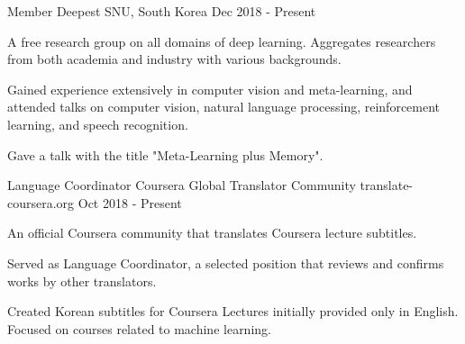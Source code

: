 

\begin{cventries}

  \cventry
    {Member} %
    {Deepest} %
    {SNU, South Korea} %
    {Dec 2018 - Present} %
    {
      \begin{cvitems} %
        \item {A free research group on all domains of deep learning. Aggregates researchers from both academia and industry with various backgrounds.}
        \item {Gained experience extensively in computer vision and meta-learning, and attended talks on computer vision, natural language processing, reinforcement learning, and speech recognition.}
        \item {Gave a talk with the title "Meta-Learning plus Memory".}
      \end{cvitems}
    }

  \cventry
    {Language Coordinator} %
    {Coursera Global Translator Community} %
    {translate-coursera.org} %
    {Oct 2018 - Present} %
    {
      \begin{cvitems} %
        \item {An official Coursera community that translates Coursera lecture subtitles.}
        \item {Served as Language Coordinator, a selected position that reviews and confirms works by other translators.}
        \item {Created Korean subtitles for Coursera Lectures initially provided only in English. Focused on courses related to machine learning.}
      \end{cvitems}
    }

\end{cventries}

